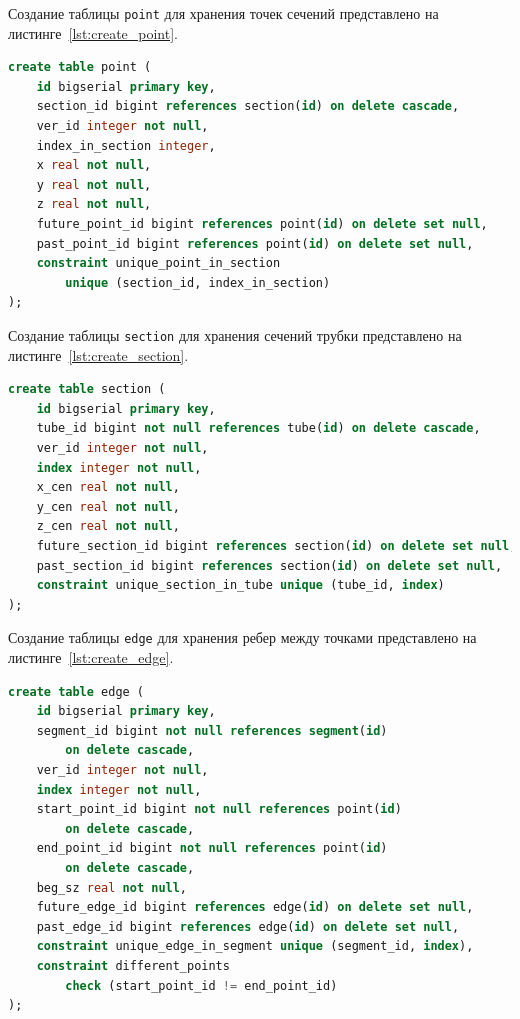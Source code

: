\noindent
\hspace{1.25cm}
Создание таблицы \texttt{point} для хранения точек сечений представлено на листинге~\ref{lst:create_point}.

\begin{lstlisting}[caption={Создание таблицы point}, label=lst:create_point, language=SQL]
create table point (
    id bigserial primary key,
    section_id bigint references section(id) on delete cascade,
    ver_id integer not null,
    index_in_section integer,
    x real not null,
    y real not null,
    z real not null,
    future_point_id bigint references point(id) on delete set null,
    past_point_id bigint references point(id) on delete set null,
    constraint unique_point_in_section 
        unique (section_id, index_in_section)
);
\end{lstlisting}

\noindent
\hspace{1.25cm}
Создание таблицы \texttt{section} для хранения сечений трубки представлено на листинге~\ref{lst:create_section}.

\begin{lstlisting}[caption={Создание таблицы section}, label=lst:create_section, language=SQL]
create table section (
    id bigserial primary key,
    tube_id bigint not null references tube(id) on delete cascade,
    ver_id integer not null,
    index integer not null,
    x_cen real not null,
    y_cen real not null,
    z_cen real not null,
    future_section_id bigint references section(id) on delete set null,
    past_section_id bigint references section(id) on delete set null,
    constraint unique_section_in_tube unique (tube_id, index)
);
\end{lstlisting}

\noindent
\hspace{1.25cm}
Создание таблицы \texttt{edge} для хранения ребер между точками представлено на листинге~\ref{lst:create_edge}.

\begin{lstlisting}[caption={Создание таблицы edge}, label=lst:create_edge, language=SQL]
create table edge (
    id bigserial primary key,
    segment_id bigint not null references segment(id) 
        on delete cascade,
    ver_id integer not null,
    index integer not null,
    start_point_id bigint not null references point(id) 
        on delete cascade,
    end_point_id bigint not null references point(id) 
        on delete cascade,
    beg_sz real not null,
    future_edge_id bigint references edge(id) on delete set null,
    past_edge_id bigint references edge(id) on delete set null,
    constraint unique_edge_in_segment unique (segment_id, index),
    constraint different_points 
        check (start_point_id != end_point_id)
);
\end{lstlisting}

